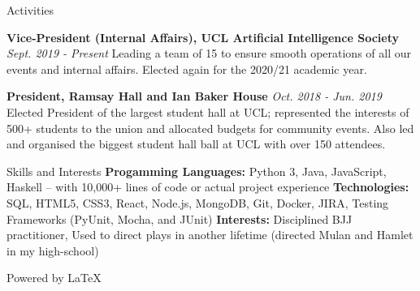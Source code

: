 \documentclass{resume}
\begin{document}
\begin{rSection}{\small{Activities}}

{\bf \footnotesize Vice-President (Internal Affairs), UCL Artificial Intelligence Society}
\hfill {\footnotesize \textit{Sept. 2019 - Present}} \newline
\footnotesize{Leading a team of 15 to ensure smooth operations of all our events and internal affairs. Elected again for the 2020/21 academic year.}

{\bf \footnotesize President, Ramsay Hall and Ian Baker House}
\hfill {\footnotesize \textit{Oct. 2018 - Jun. 2019}} \newline
\footnotesize{Elected President of the largest student hall at UCL; represented the interests of 500+ students to the union and allocated budgets for community events. Also led and organised the biggest student hall ball at UCL with over 150 attendees.}


\end{rSection}

\begin{rSection}{\small{Skills and Interests}}
{\footnotesize{\bf Progamming Languages:} \footnotesize{Python 3, Java, JavaScript, Haskell}}
\hfill \footnotesize{-- with 10,000+ lines of code or actual project experience}\newline
{\footnotesize{\bf Technologies:} \footnotesize{SQL, HTML5, CSS3, React, Node.js, MongoDB, Git, Docker, JIRA, Testing Frameworks (PyUnit, Mocha, and JUnit)}}\newline
{\footnotesize{\bf Interests:} \footnotesize{Disciplined BJJ practitioner, Used to direct plays in another lifetime (directed Mulan and Hamlet in my high-school)}}
\newline

\hfill\tiny{Powered by \LaTeX}

\end{rSection}
\end{document}
